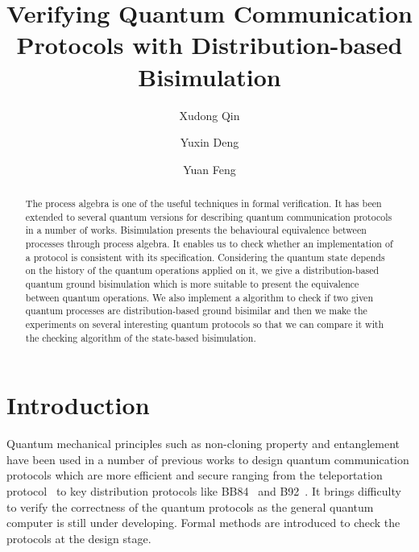\documentclass[runningheads]{llncs}
\begin{document}
%
\title{Verifying Quantum Communication Protocols with Distribution-based Bisimulation}
%
%
\author{Xudong Qin\and
Yuxin Deng \and 
Yuan Feng}
%
%
%
\maketitle              %
%
\begin{abstract}
The process algebra is one of the useful techniques in formal verification. It has been extended to several quantum versions for describing quantum communication protocols in a number of works. Bisimulation presents the behavioural equivalence between processes through process algebra. It enables us to check whether an implementation of a protocol is consistent with its specification. Considering the quantum state depends on the history of the quantum operations applied on it, we give a distribution-based quantum ground bisimulation which is more suitable to present the equivalence between quantum operations. We also implement a algorithm to check if two given quantum processes are distribution-based ground bisimilar and then we make the experiments on several interesting quantum protocols so that we can compare it with the checking algorithm of the state-based bisimulation.

\end{abstract}
%
%
%
\section{Introduction}
Quantum mechanical principles such as non-cloning property and entanglement have been used in a number of previous works to design quantum communication protocols which are more efficient and secure ranging from the teleportation protocol~\cite{BB93} to key distribution protocols like BB84~\cite{BB84} and B92~\cite{B92}. It brings difficulty to verify the correctness of the quantum protocols as the general quantum computer is still under developing. Formal methods are introduced to check the protocols at the design stage. 
\end{document}
